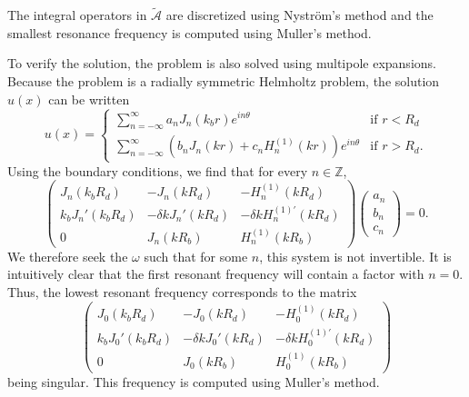 \documentclass[a4paper]{article}
\theoremstyle{definition}
\newcommand{\Z}{\mathbb{Z}}
\begin{document}
The integral operators in $\tilde{\mathcal{A}}$ are discretized using Nyström's method and the smallest resonance frequency is computed using Muller's method. \cite{first}

To verify the solution, the problem is also solved using multipole expansions. Because the problem is a radially symmetric Helmholtz problem, the solution $u(x)$ can be written
\begin{equation*}
u(x) = \begin{cases}
\sum_{n=-\infty}^\infty a_n J_n(k_br)e^{in\theta} \quad &\text{if } r<R_d \\
\sum_{n=-\infty}^\infty \left(b_n J_n(kr) + c_n H^{(1)}_n(kr)\right) e^{in\theta}  &\text{if } r>R_d.
\end{cases}
\end{equation*}
Using the boundary conditions, we find that for every $n\in \Z$,
\begin{equation*} 
\begin{pmatrix}
J_n(k_bR_d) &  -J_n(kR_d) & -H_n^{(1)}(kR_d) \\
k_bJ_n'(k_bR_d) & -\delta kJ_n'(kR_d) & -\delta k H^{(1)'}_n(kR_d)\\
0 & J_n(kR_b) & H^{(1)}_n(kR_b)
\end{pmatrix}
\begin{pmatrix}
a_n \\ b_n \\ c_n
\end{pmatrix} = 0.
\end{equation*}
We therefore seek the $\omega$ such that for some $n$, this system is not invertible. It is intuitively clear that the first resonant frequency will contain a factor with $n=0$. Thus, the lowest resonant frequency corresponds to the matrix
\begin{equation*} 
\begin{pmatrix}
J_0(k_bR_d) &  -J_0(kR_d) & -H_0^{(1)}(kR_d) \\
k_bJ_0'(k_bR_d) & -\delta kJ_0'(kR_d) & -\delta k H^{(1)'}_0(kR_d)\\
0 & J_0(kR_b) & H^{(1)}_0(kR_b)
\end{pmatrix}
\end{equation*}
being singular. This frequency is computed using Muller's method.
\end{document}
